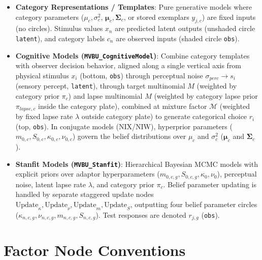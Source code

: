 \documentclass[11pt]{report}
\begin{document}
\begin{itemize}
  \item \textbf{Category Representations / Templates}: Pure generative models where category parameters ($\mu_c, \sigma^2_c$, $\boldsymbol{\mu}_c, \boldsymbol{\Sigma}_c$, or stored exemplars $y_{j,c}$) are fixed inputs (no circles). Stimulus values $x_n$ are predicted latent outputs (unshaded circle \texttt{latent}), and category labels $c_n$ are observed inputs (shaded circle \texttt{obs}).
  \item \textbf{Cognitive Models (\texttt{MVBU\_CognitiveModel})}: Combine category templates with observer decision behavior, aligned along a single vertical axis from physical stimulus $x_i$ (bottom, \texttt{obs}) through perceptual noise $\sigma_{perc} \to s_i$ (sensory percept, \texttt{latent}), through target multinomial $M$ (weighted by category prior $\pi_c$) and lapse multinomial $M$ (weighted by category lapse prior $\pi_{lapse,c}$ inside the category plate), combined at mixture factor $\mathcal{M}$ (weighted by fixed lapse rate $\lambda$ outside category plate) to generate categorical choice $r_i$ (top, \texttt{obs}). In conjugate models (NIX/NIW), hyperprior parameters ($m_{0,c}, S_{0,c}, \kappa_{0,c}, \nu_{0,c}$) govern the belief distributions over $\mu_c$ and $\sigma^2_c$ ($\boldsymbol{\mu}_c$ and $\boldsymbol{\Sigma}_c$).
  \item \textbf{Stanfit Models (\texttt{MVBU\_Stanfit})}: Hierarchical Bayesian MCMC models with explicit priors over adaptor hyperparameters ($m_{0,c,g}, S_{0,c,g}, \kappa_0, \nu_0$), perceptual noise, latent lapse rate $\lambda$, and category prior $\pi_c$. Belief parameter updating is handled by separate staggered update nodes $\text{Update}_\kappa, \text{Update}_\nu, \text{Update}_m, \text{Update}_S$, outputting four belief parameter circles ($\kappa_{n,c,g}, \nu_{n,c,g}, m_{n,c,g}, S_{n,c,g}$). Test responses are denoted $r_{j,g}$ (\texttt{obs}).
\end{itemize}

\section{Factor Node Conventions}
\end{document}
